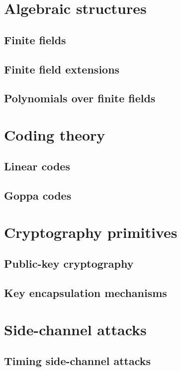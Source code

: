 \section{Algebraic structures}
\subsection{Finite fields}
\subsection{Finite field extensions}
\subsection{Polynomials over finite fields}
\section{Coding theory}
\subsection{Linear codes}
\subsection{Goppa codes}
\section{Cryptography primitives}
\subsection{Public-key cryptography}
\subsection{Key encapsulation mechanisms}
\section{Side-channel attacks}
\subsection{Timing side-channel attacks}
